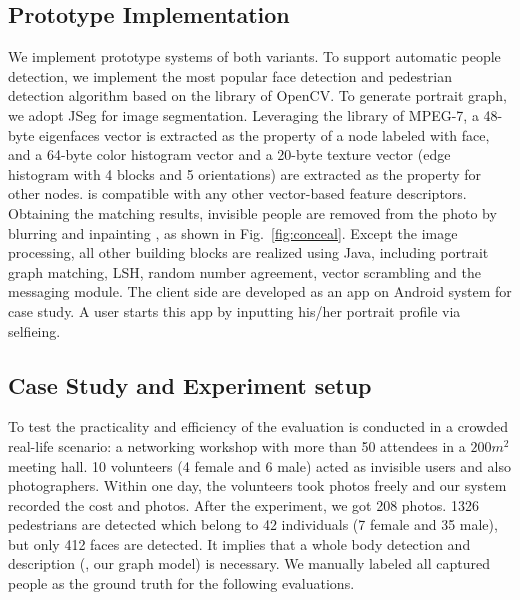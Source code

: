 




\subsection{Prototype Implementation}
\vspace{-0.05in}
We implement prototype systems of both variants.
To support automatic people detection, we implement the most popular face detection \cite{viola2004robust}
 and pedestrian detection \cite{leibe2005pedestrian} algorithm based on the library of OpenCV.
To generate portrait graph,
we adopt JSeg \cite{deng2001unsupervised} for image segmentation.
Leveraging the library of MPEG-7,
a 48-byte eigenfaces vector\cite{turk1991eigenfaces} is extracted as the property of a node labeled with face,
 and a 64-byte color histogram vector and a 20-byte texture vector (edge histogram with 4 blocks and 5 orientations)
 are extracted as the property for other nodes.
\ourprotocol is compatible with any other vector-based feature descriptors.
Obtaining the matching results, invisible people are removed from the photo by blurring and inpainting \cite{criminisi2004region},
 as shown in Fig.~\ref{fig:conceal}.
Except the image processing,
 all other building blocks are realized using Java, including portrait graph matching,
 LSH, random number agreement, vector scrambling and the messaging module.
The client side are developed as an app on Android system for case study.
A user starts this app by inputting his/her portrait profile via selfieing.




\vspace{-0.05in}
\subsection{Case Study and Experiment setup}
\label{sec:case}
\vspace{-0.05in}




To test the practicality and efficiency of \ourprotocol
 the evaluation is conducted in a crowded real-life scenario:
 a networking workshop with more than 50 attendees in a $200m^2$ meeting hall.
10 volunteers (4 female and 6 male) acted as invisible users and also photographers.
Within one day, the volunteers took photos freely and our system recorded the cost and photos.
After the experiment, we got 208 photos.
1326 pedestrians are detected which belong to 42 individuals (7
 female and 35 male), but only 412 faces are detected.
It implies that
a whole body detection and description (\eg, our graph model) is necessary.
We manually labeled all captured people as the ground truth for the following evaluations.




